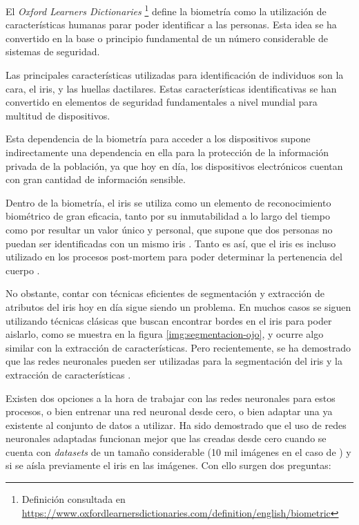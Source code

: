  \label{capitulo1}

El \textit{Oxford Learners Dictionaries} \footnote{Definición consultada en \url{https://www.oxfordlearnersdictionaries.com/definition/english/biometric}} define la biometría como la utilización de características humanas parar poder identificar a las personas. Esta idea se ha convertido en la base o principio fundamental de un número considerable de sistemas de seguridad.

Las principales características utilizadas para identificación de individuos son la cara, el iris, y las huellas dactilares. Estas características identificativas se han convertido en elementos de seguridad fundamentales a nivel mundial para multitud de dispositivos. 

Esta dependencia de la biometría para acceder a los dispositivos supone indirectamente una dependencia en ella para la protección de la información privada de la población, ya que hoy en día, los dispositivos electrónicos cuentan con gran cantidad de información sensible.

Dentro de la biometría, el iris se utiliza como un elemento de reconocimiento biométrico de gran eficacia, tanto por su inmutabilidad a lo largo del tiempo como por resultar un valor único y 
personal, que supone que dos personas no puedan ser identificadas con un mismo iris \cite{malgheet_iris_2021}. Tanto es así, que el iris es incluso utilizado en los procesos 
post-mortem para poder determinar la pertenencia del cuerpo \cite{dd_post-mortem_2020}.

No obstante, contar con técnicas eficientes de segmentación y extracción de atributos del iris hoy en día sigue siendo un problema. En muchos casos se siguen utilizando técnicas clásicas que buscan encontrar bordes en el iris para poder aislarlo, como se muestra en la figura \ref{img:segmentacion-ojo}, y ocurre algo similar con la extracción de características.
Pero recientemente, se ha demostrado que las redes neuronales pueden ser utilizadas para la segmentación del iris \cite{lozej_end--end_2018} y la extracción de características \cite{tfg_iris_2020}\cite{boyd_deep_2020}.

Existen dos opciones a la hora de trabajar con las redes neuronales para estos procesos, o bien entrenar una red neuronal desde cero, o bien adaptar una ya existente al conjunto de datos a utilizar. Ha sido demostrado que el uso de redes neuronales adaptadas funcionan mejor que las creadas desde cero cuando se cuenta con \textit{datasets} de un tamaño considerable (10 mil imágenes en el caso de \cite{boyd_deep_2020}) y si se aísla previamente el iris en las imágenes.
Con ello surgen dos preguntas:

